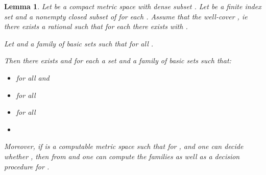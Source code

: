 \documentclass[microtype]{jloganal}
\theoremstyle{plain}
\newtheorem{lemma}[theorem]{Lemma}
\theoremstyle{definition}
\begin{document}
\begin{lemma}
\label{lem-split}
Let  be a compact metric space with dense subset .  Let  be a
finite index set and  a nonempty closed subset of  for each . Assume that the  well-cover , ie there exists a rational 
 such that for each  there exists  with
.

Let  and  a family of basic sets such that 
 for all .

Then there exists  and for each  a set 
 and a family of basic sets 
such that:
\begin{itemize}
\item[-]  for all  and 
\item[-]  for all 
\item[-]  for all 
\item[-] 
\end{itemize}
Moreover, if  is a computable metric space such that for , 
 and  one can decide whether  
, then from  
and  one can compute the families  as well as
a decision procedure for .

\end{lemma}
\end{document}
